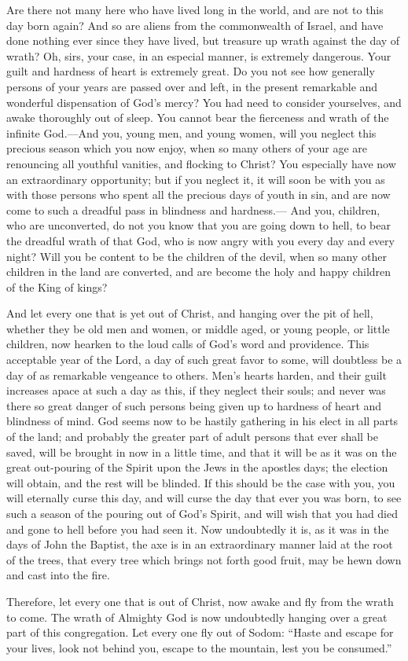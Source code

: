 \documentclass[
]{book}
\begin{document}
Are there not many here who have lived long in the world, and are not to this day born again? And so are aliens from the commonwealth of Israel, and have done nothing ever since they have lived, but treasure up wrath against the day of wrath? Oh, sirs, your case, in an especial manner, is extremely dangerous. Your guilt and hardness of heart is extremely great. Do you not see how generally persons of your years are passed over and left, in the present remarkable and wonderful dispensation of God's mercy? You had need to consider yourselves, and awake thoroughly out of sleep. You cannot bear the fierceness and wrath of the infinite God.---And you, young men, and young women, will you neglect this precious season which you now enjoy, when so many others of your age are renouncing all youthful vanities, and flocking to Christ? You especially have now an extraordinary opportunity; but if you neglect it, it will soon be with you as with those persons who spent all the precious days of youth in sin, and are now come to such a dreadful pass in blindness and hardness.--- And you, children, who are unconverted, do not you know that you are going down to hell, to bear the dreadful wrath of that God, who is now angry with you every day and every night? Will you be content to be the children of the devil, when so many other children in the land are converted, and are become the holy and happy children of the King of kings?

And let every one that is yet out of Christ, and hanging over the pit of hell, whether they be old men and women, or middle aged, or young people, or little children, now hearken to the loud calls of God's word and providence. This acceptable year of the Lord, a day of such great favor to some, will doubtless be a day of as remarkable vengeance to others. Men's hearts harden, and their guilt increases apace at such a day as this, if they neglect their souls; and never was there so great danger of such persons being given up to hardness of heart and blindness of mind. God seems now to be hastily gathering in his elect in all parts of the land; and probably the greater part of adult persons that ever shall be saved, will be brought in now in a little time, and that it will be as it was on the great out-pouring of the Spirit upon the Jews in the apostles days; the election will obtain, and the rest will be blinded. If this should be the case with you, you will eternally curse this day, and will curse the day that ever you was born, to see such a season of the pouring out of God's Spirit, and will wish that you had died and gone to hell before you had seen it. Now undoubtedly it is, as it was in the days of John the Baptist, the axe is in an extraordinary manner laid at the root of the trees, that every tree which brings not forth good fruit, may be hewn down and cast into the fire.

Therefore, let every one that is out of Christ, now awake and fly from the wrath to come. The wrath of Almighty God is now undoubtedly hanging over a great part of this congregation. Let every one fly out of Sodom: ``Haste and escape for your lives, look not behind you, escape to the mountain, lest you be consumed.''
\end{document}
